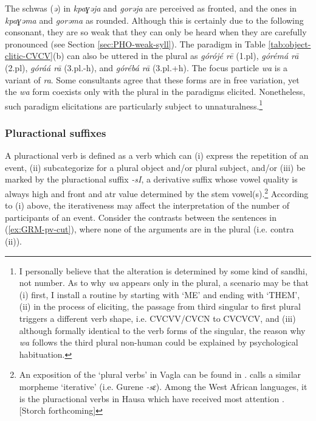 \begin{exe}
\begin{exe}
\begin{exe}
{\begin{exe}
\begin{exe}
\begin{exe}
\begin{exe}
\begin{exe}
\begin{exe}
\begin{exe}
\begin{xlist}
\begin{exe}
\begin{exe}
\begin{exe}
\begin{exe}
\begin{exe}
\begin{exe}
\begin{exe}
\begin{exe}
\begin{exe}
\begin{exe}
\begin{exe}
\begin{exe}
\begin{exe}
\begin{exe}
\begin{exe}
The schwas ({\it ə}) in {\it kpaɣəja} and  {\it gorəja} are perceived as 
fronted,
and the ones in {\it kpaɣəma} and {\it gorəma}  as rounded. Although this is
certainly due to the following consonant, they are so weak that they can only be
heard when they are carefully pronounced (see Section \ref{sec:PHO-weak-syll}). 
The paradigm in Table  
\ref{tab:object-clitic-CVCV}(b) can also be uttered in the plural as 
{\it górójé rē} ({\sc 1.pl}),  %
{\it górémá rā} ({\sc 2.pl}), %
{\it góráá rā} ({\sc 3.pl.-h}), and %
{\it górébá rā} ({\sc 3.pl.+h}). 
 The focus particle {\it wa} is a
variant of {\it ra}. Some consultants  agree that these forms are in free 
variation,
yet the {\it wa} form coexists only with  the plural in the paradigms elicited.
Nonetheless, such paradigm elicitations are particularly subject to
unnaturalness.\footnote{I personally believe that the alteration is
determined by some kind of sandhi, not number. As to why {\it wa} appears only 
in
the plural, a scenario may be that (i) first, I install a routine by starting
with `ME' and ending with `THEM', (ii) in the process of eliciting, the passage
from third singular to first plural triggers  a different verb shape, i.e.
CVCVV/CVCN  to CVCVCV, and (iii)  although formally identical to the verb forms
of the singular, the reason why {\it wa} follows the third plural non-human 
could
be explained by psychological habituation.}

\subsubsection{Pluractional suffixes}
\label{sec:GRM-PluralVerb}


A pluractional verb is defined as a verb which can (i) express the repetition of
an event,  (ii)   subcategorize for a plural object and/or  plural subject,
and/or  (iii)  be marked by the pluractional suffix {\it -sI}, a derivative 
suffix whose  vowel quality is always high and
front
and  {\sc atr} value determined by the stem vowel(s).\footnote{An exposition of
the
`plural verbs' in Vagla can be found in \citet{Blen03}. \citet[viii]{daku07}
calls a similar morpheme `iterative' (i.e. Gurene {\it -sɛ}).  Among the West
African
languages, it is the pluractional verbs in Hausa which have received most
attention \citep[see][]{Jose08}. [Storch forthcoming]}  According to (i) above, 
the iterativeness may
affect the interpretation of the number of participants of an event. Consider
the contrasts between the 
sentences in (\ref{ex:GRM-pv-cut}), where none of the arguments are in the
plural (i.e. contra (ii)).



\end{exe}
\end{exe}
\end{exe}
\end{exe}
\end{exe}
\end{exe}
\end{exe}
\end{exe}
\end{exe}
\end{exe}
\end{exe}
\end{exe}
\end{exe}
\end{exe}
\end{exe}
\end{xlist}
\end{exe}
\end{exe}
\end{exe}
\end{exe}
\end{exe}
\end{exe}
\end{exe}}
\end{exe}
\end{exe}
\end{exe}
